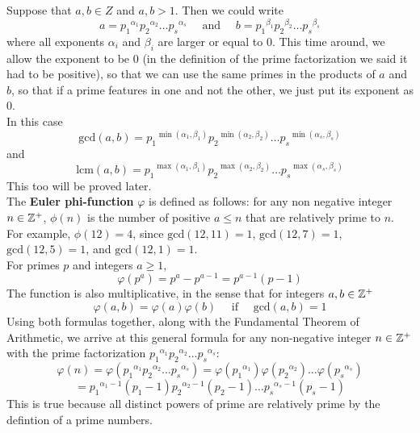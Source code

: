 \documentclass[12pt]{article}
\begin{document}
    Suppose that $a, b \in Z$ and $a, b > 1$.
    Then we could write
    \[ a = {p_1}^{\alpha_1}{p_2}^{\alpha_2} \dots {p_s}^{\alpha_s}
    \quad \text{ and } \quad
    b = {p_1}^{\beta_1}{p_2}^{\beta_2} \dots {p_s}^{\beta_s} \]
    where all exponents $\alpha_i$ and $\beta_i$
    are larger or equal to $0$.
    This time around, we allow the exponent to be $0$
    (in the definition of the prime factorization
    we said it had to be positive),
    so that we can use the same primes in the products of $a$ and $b$,
    so that if a prime features in one and not the other,
    we just put its exponent as $0$. \\
    In this case
    \[ \text{gcd}(a, b) = 
    {p_1}^{\min(\alpha_1, \beta_1)}
    {p_2}^{\min(\alpha_2, \beta_2)} \dots
    {p_s}^{\min(\alpha_s, \beta_s)} \]
    and 
    \[ \text{lcm}(a, b) = 
    {p_1}^{\max(\alpha_1, \beta_1)}
    {p_2}^{\max(\alpha_2, \beta_2)} \dots
    {p_s}^{\max(\alpha_s, \beta_s)} \]
    This too will be proved later. \\

    The \textbf{Euler phi-function} $\varphi$ is defined as follows:
    for any non negative integer $n \in \mathbb{Z}^+$,
    $\phi(n)$ is the number of positive $a \leqslant n$
    that are relatively prime to $n$.
    For example, $\phi(12) = 4$,
    since $\text{gcd}(12, 11) = 1$,
    $\text{gcd}(12, 7) = 1$,
    $\text{gcd}(12, 5) = 1$,
    and $\text{gcd}(12, 1) = 1$. \\
    For primes $p$ and integers $a \geqslant 1$,
    \[ \varphi(p^a) = p^{a} - p^{a-1} = p^{a-1}(p - 1) \]
    The function is also multiplicative,
    in the sense that for integers $a, b \in \mathbb{Z}^+$
    \[ \varphi(a, b) = \varphi(a)\varphi(b)
    \quad \text{ if } \quad \text{gcd}(a, b) = 1 \]
    Using both formulas together,
    along with the Fundamental Theorem of Arithmetic,
    we arrive at this general formula
    for any non-negative integer $n \in \mathbb{Z}^+$
    with the prime factorization
    ${p_1}^{\alpha_1}{p_2}^{\alpha_2} \dots {p_s}^{\alpha_s}$:
    \[ \varphi(n) = 
    \varphi({p_1}^{\alpha_1}{p_2}^{\alpha_2} \dots {p_s}^{\alpha_s}) =
    \varphi({p_1}^{\alpha_1})\varphi({p_2}^{\alpha_2}) \dots 
    \varphi({p_s}^{\alpha_s})\]
    \[ = {p_1}^{\alpha_1 - 1}(p_1 - 1){p_2}^{\alpha_2 - 1}(p_2 - 1)
    \dots {p_s}^{\alpha_s - 1}(p_s - 1) \]
    This is true because all distinct powers of prime are relatively prime
    by the defintion of a prime numbers. \\
\end{document}

